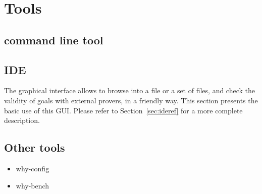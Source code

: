 \chapter{Tools}
\label{chap:tools}

\section{\why command line tool}

\section{IDE}

The graphical interface allows to browse into a file or a set of
files, and check the validity of goals with external provers, in a
friendly way. This section presents the basic use of this GUI. Please refer to Section~\ref{sec:ideref} for a more complete description.

\section{Other tools}

\begin{itemize}
\item why-config
\item why-bench
\end{itemize}



